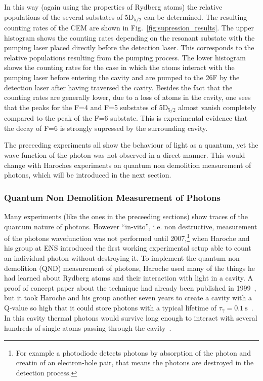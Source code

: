 In this way (again using the properties of Rydberg atoms) the relative
populations of the several substates of 5D$_{5/2}$ can be determined. The
resulting counting rates of the CEM are shown in
Fig.~\ref{fig:supression_results}. The upper histogram shows the counting
rates depending on the resonant substate with the pumping laser placed directly before the
detection laser. This corresponds to the relative populations resulting from the
pumping process. The lower histogram shows the counting rates for the case
in which the atoms interact with the pumping laser before entering the cavity
and are pumped to the 26F by the detection laser after having traversed the
cavity. Besides the fact that the counting rates are generally lower, due to a
loss of atoms in the cavity, one sees that the peaks for the F=4 and F=5
substates of 5D$_{5/2}$ almost vanish completely compared to the peak of the F=6
substate. This is experimental evidence that the decay of F=6 is strongly
supressed by the surrounding cavity.

The preceeding experiments all show the behaviour of light as a quantum, yet the
wave function of the photon was not observed in a direct manner. This would
change with Haroches experiments on quantum non demolition measurement of
photons, which will be introduced in the next section.


\subsubsection{Quantum Non Demolition Measurement of Photons}
\label{sec:QND}
Many experiments (like the ones in the preceeding sections) show traces of the
quantum nature of photons. However ``in-vito'', i.e. non destructive,
measurement of the photons wavefunction was not performed until
2007,\footnote{For example a photodiode detects photons by absorption of the
  photon and creatin of an electron-hole pair, that
means the photons are destroyed in the detection process.} when Haroche and his
group at ENS introduced the first working experimental setup able to count an
individual photon without destroying it. To implement the quantum non demolition
(QND) measurement of photons, Haroche used many of the things he had learned
about Rydberg atoms and their interaction with light in a cavity. A proof of
concept paper about the technique had already been published in 1999~\cite{haroche1999SinglePhoton}, 
but it took Haroche and his group another seven
years to create a cavity with a Q-value so high that it could store photons with
a typical lifetime of $\tau_\gamma = \SI{0.1}{\second}$~\cite{kuhr2006ultrahigh}. 
In this cavity thermal photons would survive long
enough to interact with several hundreds of single atoms passing through the
cavity~\cite{haroche2007QuantumJumps}.


